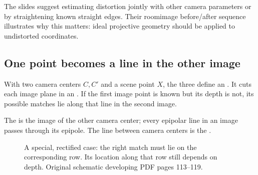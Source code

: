 \documentclass[letterpaper,11pt,english,openany,oneside]{jupyterBook}
\begin{document}
\sphinxAtStartPar
The slides suggest estimating distortion jointly with other camera parameters or by straightening known straight edges. Their room\sphinxhyphen{}image before/after sequence illustrates why this matters: ideal projective geometry should be applied to undistorted coordinates.


\subsection{One point becomes a line in the other image}
\label{\detokenize{lectures/lecture02/two-view:one-point-becomes-a-line-in-the-other-image}}
\sphinxAtStartPar
With two camera centers \(C,C'\) and a scene point \(X\), the three define an . It cuts each image plane in an . If the first image point is known but its depth is not, its possible matches lie along that line in the second image.

\sphinxAtStartPar
The  is the image of the other camera center; every epipolar line in an image passes through its epipole. The line between camera centers is the .

\begin{figure}[H]
\centering
\capstart

\noindent{}
\caption{A special, rectified case: the right match must lie on the corresponding row. Its location along that row still depends on depth. Original schematic developing PDF pages 113–119.}\label{\detokenize{lectures/lecture02/two-view:fig-lec02-epipolar}}\end{figure}
\end{document}
